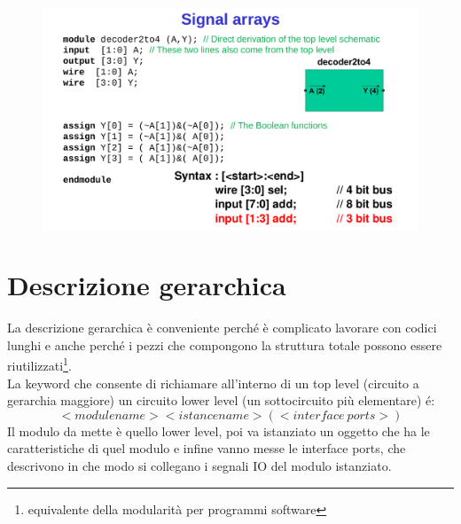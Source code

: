 \documentclass{book}
\begin{document}
    \begin{figure}[h!]
        \centering
        \includegraphics[width=0.75\linewidth]{img/chapt7img3.png}
    \end{figure}

    \section{Descrizione gerarchica}
        La descrizione gerarchica è conveniente perché è complicato lavorare con codici lunghi e anche perché i pezzi che compongono la struttura totale possono essere riutilizzati\footnote{equivalente della modularità per programmi software}. \\
        La keyword che consente di richiamare all'interno di un top level (circuito a gerarchia maggiore) un circuito lower level (un sottocircuito più elementare) é:
        $$
        <module name> <istance name>(<interface \ ports>)
        $$
        Il modulo da mette è quello lower level, poi va istanziato un oggetto che ha le caratteristiche di quel modulo e infine vanno messe le interface ports, che descrivono in che modo si collegano i segnali IO del modulo istanziato. \newpage
\end{document}
